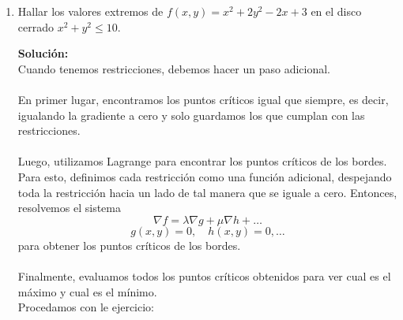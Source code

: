 \documentclass[12pt]{article}
\newenvironment{solucion}
{\begin{mdframed}[backgroundcolor=black!10]
		{\bf Solución:}\\
	}
	{
	\end{mdframed}
}
\newenvironment{preguntas}
{\begin{enumerate}\itemsep12pt
	}
	{
	\end{enumerate}
}
\newcommand{\ra}{\rightarrow}
\begin{document}
\begin{preguntas}
\begin{solucion}
Evaluando en $(1,1)$,
$$\nabla f(1,1) = \begin{pmatrix} 2a + b \\ a + 2b + a^2\end{pmatrix} = 0$$
Luego,
$$2a + b = 0$$
$$a + 2b + a^2= 0$$
Reemplazando la primera ecuación ($b = -2a$) en la segunda obtenemos,
$$a^2 - 3a +2 = 0 \ra (a-2)(a-1) = 0$$
De aquí obtememos
$$a = 1 \ra b = -2, \qquad a = 2 \ra b = -4$$
Veamos ahora cuál de estos valores de $a$ y $b$ cumplen la restricción del Hessiano.
$$f_{xx} = 2ay, \quad f_{yy} = 2bx + a^2, \quad f_{xy} = 2ax + 2by$$
Luego,
$$H(x,y) = 2ay(2bx+a^2) - (2ax +2by)^2$$
Evaluamos,
$$H(1,1) = 2a(2b+a^2) - (2a+2b)^2$$
Probamos con $a=1$ y $b=-2$,
$$H = 2(-4+1)-(2-4)^2 = -6 - 4 = -10 < 0$$
Por lo que si es un punto silla.\\
\\
Probemos ahora ocn $a = 2$ y $b = -4$
$$H = 4(-8-4)-(4-8)^2 = -16 - 16 = -32 < 0$$
Por lo que si es un punto silla.\\

Finalmente, los valores que puede tomar $a$ y $b$ son $(1, -2)$ y $(2, -4)$
\end{solucion}
\item Hallar los valores extremos de $f(x,y) = x^2+2y^2-2x+3$ en el disco cerrado $x^2+y^2 \leq 10$.
\begin{solucion}
Cuando tenemos restricciones, debemos hacer un paso adicional. \\
\\
En primer lugar, encontramos los puntos críticos igual que siempre, es decir, igualando la gradiente a cero y solo guardamos los que cumplan con las restricciones. \\
\\
Luego, utilizamos Lagrange para encontrar los puntos críticos de los bordes. Para esto, definimos cada restricción como una función adicional, despejando toda la restricción hacia un lado de tal manera que se iguale a cero. Entonces, resolvemos el sistema
$$\nabla f = \lambda \nabla g + \mu \nabla h + \dots$$
$$g(x,y) = 0, \quad h(x,y) = 0, \dots$$
para obtener los puntos críticos de los bordes.\\
\\
Finalmente, evaluamos todos los puntos críticos obtenidos para ver cual es el máximo y cual es el mínimo.\\

Procedamos con le ejercicio:\\


\end{solucion}
\end{preguntas}
\end{document}
